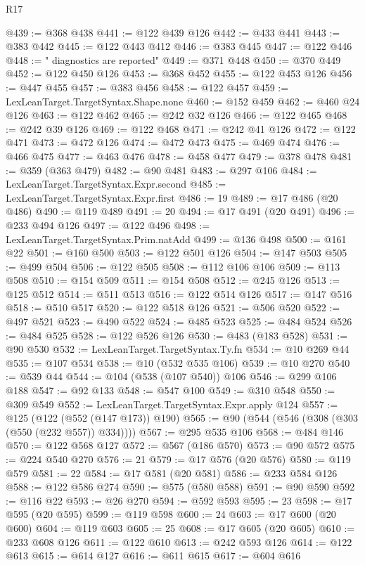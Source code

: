 \begin{lexlean}{R17}
\begin{coremodule}
{{{{{{{{{{{{{{{{{{{{{{{{{{{{{{{{{{{{{{{{{{{{{{{{{{{{{{{{{{{{{{{{{{{{{{{{{{{{{{{{{{{{{{{{{{{{{{{{{{{{{{{{{{{@439 := @368 @438
@441 := @122 @439 @126
@442 := @433 @441
@443 := @383 @442
@445 := @122 @443 @412
@446 := @383 @445
@447 := @122 @446
@448 := " diagnostics are reported"
@449 := @371 @448
@450 := @370 @449
@452 := @122 @450 @126
@453 := @368 @452
@455 := @122 @453 @126
@456 := @447 @455
@457 := @383 @456
@458 := @122 @457
@459 := LexLeanTarget.TargetSyntax.Shape.none
@460 := @152 @459
@462 := @460 @24 @126
@463 := @122 @462
@465 := @242 @32 @126
@466 := @122 @465
@468 := @242 @39 @126
@469 := @122 @468
@471 := @242 @41 @126
@472 := @122 @471
@473 := @472 @126
@474 := @472 @473
@475 := @469 @474
@476 := @466 @475
@477 := @463 @476
@478 := @458 @477
@479 := @378 @478
@481 := @359 (@363 @479)
@482 := @90 @481
@483 := @297 @106
@484 := LexLeanTarget.TargetSyntax.Expr.second
@485 := LexLeanTarget.TargetSyntax.Expr.first
@486 := 19
@489 := @17 @486 (@20 @486)
@490 := @119 @489
@491 := 20
@494 := @17 @491 (@20 @491)
@496 := @233 @494 @126
@497 := @122 @496
@498 := LexLeanTarget.TargetSyntax.Prim.natAdd
@499 := @136 @498
@500 := @161 @22
@501 := @160 @500
@503 := @122 @501 @126
@504 := @147 @503
@505 := @499 @504
@506 := @122 @505
@508 := @112 @106 @106
@509 := @113 @508
@510 := @154 @509
@511 := @154 @508
@512 := @245 @126
@513 := @125 @512
@514 := @511 @513
@516 := @122 @514 @126
@517 := @147 @516
@518 := @510 @517
@520 := @122 @518 @126
@521 := @506 @520
@522 := @497 @521
@523 := @490 @522
@524 := @485 @523
@525 := @484 @524
@526 := @484 @525
@528 := @122 @526 @126
@530 := @483 (@183 @528)
@531 := @90 @530
@532 := LexLeanTarget.TargetSyntax.Ty.fn
@534 := @10 @269 @44
@535 := @107 @534
@538 := @10 (@532 @535 @106)
@539 := @10 @270
@540 := @539 @44
@544 := @104 (@538 (@107 @540)) @106
@546 := @299 @106 @188
@547 := @92 @133
@548 := @547 @100
@549 := @310 @548
@550 := @309 @549
@552 := LexLeanTarget.TargetSyntax.Expr.apply @124
@557 := @125 (@122 (@552 (@147 @173)) @190)
@565 := @90 (@544 (@546 (@308 (@303 (@550 (@232 @557)) @334))))
@567 := @295 @535 @106
@568 := @484 @146
@570 := @122 @568 @127
@572 := @567 (@186 @570)
@573 := @90 @572
@575 := @224 @540 @270
@576 := 21
@579 := @17 @576 (@20 @576)
@580 := @119 @579
@581 := 22
@584 := @17 @581 (@20 @581)
@586 := @233 @584 @126
@588 := @122 @586 @274
@590 := @575 (@580 @588)
@591 := @90 @590
@592 := @116 @22
@593 := @26 @270
@594 := @592 @593
@595 := 23
@598 := @17 @595 (@20 @595)
@599 := @119 @598
@600 := 24
@603 := @17 @600 (@20 @600)
@604 := @119 @603
@605 := 25
@608 := @17 @605 (@20 @605)
@610 := @233 @608 @126
@611 := @122 @610
@613 := @242 @593 @126
@614 := @122 @613
@615 := @614 @127
@616 := @611 @615
@617 := @604 @616
}}}}}}}}}}}}}}}}}}}}}}}}}}}}}}}}}}}}}}}}}}}}}}}}}}}}}}}}}}}}}}}}}}}}}}}}}}}}}}}}}}}}}}}}}}}}}}}}}}}}}}}}}}}
\end{coremodule}
\end{lexlean}
